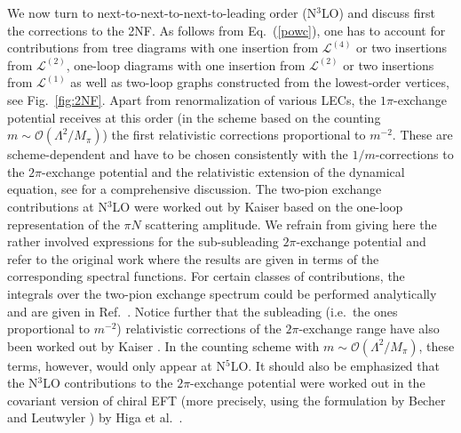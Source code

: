 \documentclass[aps,rmp,nofootinbib,twocolumn,floatfix]{revtex4}
\begin{document}
We now turn to next-to-next-to-next-to-leading order (N$^3$LO) and discuss
first the corrections to the 2NF. As follows from Eq.~(\ref{powc}), one has to 
account for contributions from tree diagrams with one insertion from
$\mathcal{L}^{(4)}$ or two insertions from $\mathcal{L}^{(2)}$, one-loop
diagrams with one insertion from  $\mathcal{L}^{(2)}$ or two insertions from $\mathcal{L}^{(1)}$
as well as two-loop graphs constructed from the lowest-order vertices, see
Fig.~\ref{fig:2NF}.  Apart from renormalization of various LECs, the
$1\pi$-exchange potential receives at this order (in the scheme based on the
counting $m \sim \mathcal{O} (\Lambda^2/M_\pi)$) the first relativistic
corrections proportional to $m^{-2}$. These are scheme-dependent and have to
be chosen consistently with the $1/m$-corrections to the $2\pi$-exchange
potential and the relativistic
extension of the dynamical equation, see \cite{Friar:1999sj} for a comprehensive
discussion. The two-pion exchange contributions at N$^3$LO were worked out by
Kaiser \cite{Kaiser:2001pc} based on the one-loop representation of the $\pi
N$ scattering amplitude. We refrain from giving here the rather involved
expressions for the sub-subleading $2\pi$-exchange potential and refer to
the original work \cite{Kaiser:2001pc} where the results are given in terms of
the corresponding spectral functions. For certain classes of contributions,
the integrals over the two-pion exchange spectrum could be performed
analytically and are given in Ref.~\cite{Entem:2002sf}.  Notice further that
the subleading (i.e.~the ones proportional to $m^{-2}$) relativistic
corrections of the $2\pi$-exchange range have also been worked out by Kaiser
\cite{Kaiser:2001at}. In the counting scheme with $m \sim \mathcal{O}
(\Lambda^2/M_\pi)$, these terms, however, would only appear at N$^5$LO.  
It should also be emphasized that the N$^3$LO contributions to the
$2\pi$-exchange potential  were worked out in the covariant version of
chiral EFT (more precisely, using the formulation by Becher and Leutwyler
\cite{Becher:1999he}) by Higa et al.~\cite{Higa:2003jk,Higa:2003sz,Higa:2005ip}.
\end{document}
